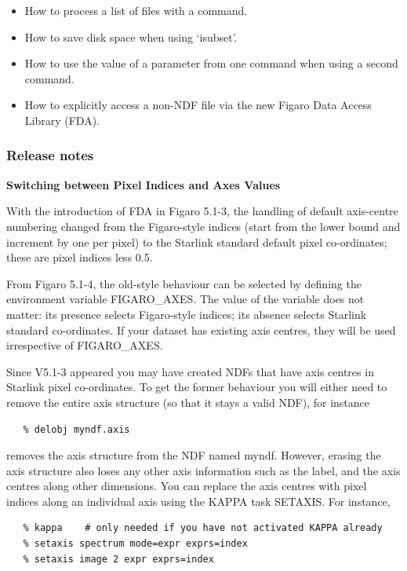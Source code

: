 \begin{itemize}
\item How to process a list of files with a command.
\item How to save disk space when using `isubset'.
\item How to use the value of a parameter from one command when using
      a second command.
\item How to explicitly access a non-NDF file via the new Figaro
      Data Access Library (FDA).
\end{itemize}

\subsubsection{\label{news514_release_notes}Release notes}

{\bf   Switching between Pixel Indices and Axes Values}

   With the introduction of FDA in Figaro 5.1-3, the handling of
   default axis-centre numbering changed from the Figaro-style
   indices (start from the lower bound and increment by one per
   pixel) to the Starlink standard default pixel co-ordinates;
   these are pixel indices less 0.5.

   From Figaro 5.1-4, the old-style behaviour can be selected by
   defining the environment variable FIGARO\_AXES.  The value of the
   variable does not matter: its presence selects Figaro-style
   indices; its absence selects Starlink standard co-ordinates.  If
   your dataset has existing axis centres, they will be used
   irrespective of FIGARO\_AXES.

   Since V5.1-3 appeared you may have created NDFs that have axis
   centres in Starlink pixel co-ordinates.  To get the former
   behaviour you will either need to remove the entire axis structure
   (so that it stays a valid NDF), for instance

\begin{verbatim}
   % delobj myndf.axis
\end{verbatim}

   removes the axis structure from the NDF named myndf.  However,
   erasing the axis structure also loses any other axis information
   such as the label, and the axis centres along other dimensions.
   You can replace the axis centres with pixel indices along an
   individual axis using the KAPPA task SETAXIS.  For instance,

\begin{verbatim}
   % kappa    # only needed if you have not activated KAPPA already
   % setaxis spectrum mode=expr exprs=index
   % setaxis image 2 expr exprs=index
\end{verbatim}

